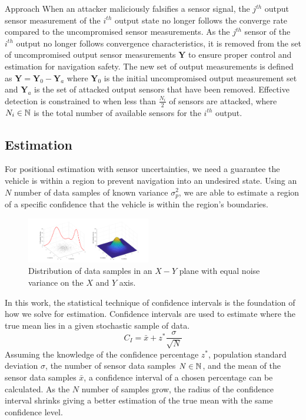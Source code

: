 \begin{section}{Approach}
When an attacker maliciously falsifies a sensor signal, the $j^{th}$ output sensor measurement of the $i^{th}$ output state no longer follows the converge rate compared to the uncompromised sensor measurements. As the $j^{th}$ sensor of the $i^{th}$ output no longer follows convergence characteristics, it is removed from the set of uncompromised output sensor measurements $\bm{Y}$ to ensure proper control and estimation for navigation safety. The new set of output measurements is defined as $\bm{Y}=\bm{Y}_0-\bm{Y}_a$ where $\bm{Y}_0$ is the initial uncompromised output measurement set and $\bm{Y}_a$ is the set of attacked output sensors that have been removed. Effective detection is constrained to when less than $\frac{N_i}{2}$ of sensors are attacked, where $N_i \in \mathbb{N}$ is the total number of available sensors for the $i^{th}$ output.



\subsection{Estimation}
For positional estimation with sensor uncertainties, we need a guarantee the vehicle is within a region to prevent navigation into an undesired state. Using an $N$ number of data samples of known variance $\sigma_p^2$, we are able to estimate a region of a specific confidence that the vehicle is within the region's boundaries.
\begin{figure}[ht!]
\vspace{1pt}
\centering
\includegraphics[width=0.48\textwidth]{GaussianPDF.png}
\caption{Distribution of data samples in an $X-Y$ plane with equal noise variance on the $X$ and $Y$ axis.}
\label{fig:gauss_pdf}
\end{figure}
In this work, the statistical technique of confidence intervals is the foundation of how we solve for estimation. Confidence intervals are used to estimate where the true mean lies in a given stochastic sample of data. 
    \begin{equation}
     \label{Confidence_interval}
		C_I = \bar{x} + z^{*}\frac{\sigma}{\sqrt{N}}
	\end{equation}
Assuming the knowledge of the confidence percentage $z^{*}$, population standard deviation $ \sigma $, the number of sensor data samples $N \in \mathbb{N}$, and the mean of the sensor data samples $ \bar{x} $, a confidence interval of a chosen percentage can be calculated. As the $N$ number of samples grow, the radius of the confidence interval shrinks giving a better estimation of the true mean with the same confidence level.


\end{section}
